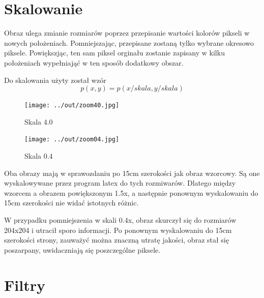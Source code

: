 \documentclass[a4paper,12pt]{article}
\begin{document}
\newpage
\section{Skalowanie}
Obraz ulega zmianie rozmiarów poprzez przepisanie wartości kolorów pikseli w nowych położeniach. Pomniejszając, przepisane zostaną tylko wybrane okresowo piksele. Powiększjąc, ten sam piksel orginału zostanie zapisany w kilku położeniach wypełniająć w ten sposób dodatkowy obszar.

Do skalowania użyty został wzór
$$p(x, y) = p(x/skala, y/skala)$$
\begin{figure}[h!]
   \centering
   \texttt{[image: ../out/zoom40.jpg]}
   \caption{Skala 4.0}
\end{figure}
\begin{figure}[h!]
   \centering
   \texttt{[image: ../out/zoom04.jpg]}
   \caption{Skala 0.4}
\end{figure}

\newpage
Oba obrazy mają w sprawozdaniu po 15cm szerokości jak obraz wzorcowy. Są one wyskalowywane przez program latex do tych rozmiwarów. Dlatego między wzorcem a obrazem powiększonym 1.5x, a następnie ponownym wyskalowaniu do 15cm szerokości nie widać istotnych różnic.


W przypadku pomniejszenia w skali 0.4x, obraz skurczył się do rozmiarów 204x204 i utracił sporo informacji. Po ponownym wyskalowaniu do 15cm szerokości strony, zauważyć można znaczną utratę jakości, obraz stał się poszarpany, uwidaczniają się poszczególne piksele.




\section{Filtry}
\end{document}
